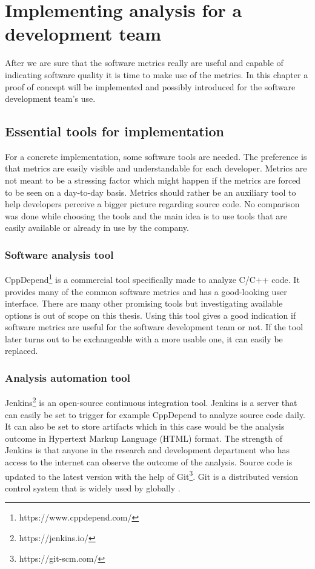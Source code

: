 \chapter{Implementing analysis for a development team}

After we are sure that the software metrics really are useful and capable of indicating software quality it is time to make use of the metrics. In this chapter a proof of concept will be implemented and possibly introduced for the software development team's use.

\section{Essential tools for implementation}

For a concrete implementation, some software tools are needed. The preference is that metrics are easily visible and understandable for each developer. Metrics are not meant to be a stressing factor which might happen if the metrics are forced to be seen on a day-to-day basis. Metrics should rather be an auxiliary tool to help developers perceive a bigger picture regarding source code. No comparison was done while choosing the tools and the main idea is to use tools that are easily available or already in use by the company.

\subsection{Software analysis tool}
\label{chap:sofanatool}

CppDepend\footnote{https://www.cppdepend.com/} is a commercial tool specifically made to analyze C/C++ code. It provides many of the common software metrics and has a good-looking user interface. There are many other promising tools but investigating available options is out of scope on this thesis. Using this tool gives a good indication if software metrics are useful for the software development team or not. If the tool later turns out to be exchangeable with a more usable one, it can easily be replaced.

\subsection{Analysis automation tool}

Jenkins\footnote{https://jenkins.io/} is an open-source continuous integration tool. Jenkins is a server that can easily be set to trigger for example CppDepend to analyze source code daily. It can also be set to store artifacts which in this case would be the analysis outcome in Hypertext Markup Language (HTML) format.  The strength of Jenkins is that anyone in the research and development department who has access to the internet can observe the outcome of the analysis. Source code is updated to the latest version with the help of Git\footnote{https://git-scm.com/}. Git is a distributed version control system that is widely used by globally \cite{gitsurvey}.

